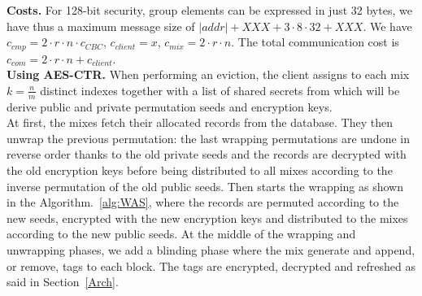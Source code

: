 \documentclass{llncs}
\begin{document}
\noindent\textbf{Costs.} For 128-bit security, group elements can be expressed in just 32 bytes, we have thus a maximum message size of $|addr|+XXX + 3 \cdot 8 \cdot 32 + XXX$. We have $c_{cmp} = 2\cdot r \cdot n \cdot c_{CBC}$, $c_{client}= x$, $c_{mix}= 2\cdot r \cdot n$. The total communication cost is $c_{com} = 2 \cdot r \cdot n+ c_{client}$.\\

\noindent\textbf{Using AES-CTR.}
When performing an eviction, the client assigns to each mix  $k=\frac{n}{m}$ distinct indexes together with a list of shared secrets from which will be derive public and private permutation seeds and encryption keys.\\
At first, the mixes fetch their allocated records from the database. They then unwrap the previous permutation: the last wrapping permutations are undone in reverse order thanks to the old private seeds and the records are decrypted with the old encryption keys before being distributed to all mixes according to the inverse permutation of the old public seeds. Then starts the wrapping as shown in the Algorithm.~\ref{alg:WAS}, where the records are permuted according to the new seeds, encrypted with the new encryption keys and distributed to the mixes according to the new public seeds. At the middle of the wrapping and unwrapping phases, we add a blinding phase where the mix generate and append, or remove, tags to each block. The tags are encrypted, decrypted and refreshed as said in Section~\ref{Arch}.\\
\iffalse
To find the ORAM index of a precise record, the client performs the index lookup function written in Algorithm.~\ref{alg:IAS}.
\fi
\\
\end{document}
